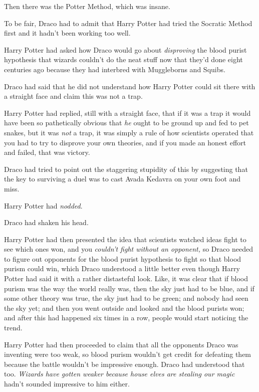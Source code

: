 Then there was the Potter Method, which was insane.

To be fair, Draco had to admit that Harry Potter had tried the Socratic
Method first and it hadn't been working too well.

Harry Potter had asked how Draco would go about \emph{disproving} the
blood purist hypothesis that wizards couldn't do the neat stuff now that
they'd done eight centuries ago because they had interbred with
Muggleborns and Squibs.

Draco had said that he did not understand how Harry Potter could sit
there with a straight face and claim this was not a trap.

Harry Potter had replied, still with a straight face, that if it was a
trap it would have been so pathetically obvious that \emph{he} ought to
be ground up and fed to pet snakes, but it was \emph{not} a trap, it was
simply a rule of how scientists operated that you had to try to disprove
your own theories, and if you made an honest effort and failed, that was
victory.

Draco had tried to point out the staggering stupidity of this by
suggesting that the key to surviving a duel was to cast Avada Kedavra on
your own foot and miss.

Harry Potter had \emph{nodded}.

Draco had shaken his head.

Harry Potter had then presented the idea that scientists watched ideas
fight to see which ones won, and you \emph{couldn't fight without an
opponent,} so Draco needed to figure out opponents for the blood purist
hypothesis to fight so that blood purism could win, which Draco
understood a little better even though Harry Potter had said it with a
rather distasteful look. Like, it was clear that if blood purism was the
way the world really was, then the sky just had to be blue, and if some
other theory was true, the sky just had to be green; and nobody had seen
the sky yet; and then you went outside and looked and the blood purists
won; and after this had happened six times in a row, people would start
noticing the trend.

Harry Potter had then proceeded to claim that all the opponents Draco
was inventing were too weak, so blood purism wouldn't get credit for
defeating them because the battle wouldn't be impressive enough. Draco
had understood that too. \emph{Wizards have gotten weaker because house
elves are stealing our magic} hadn't sounded impressive to him either.

